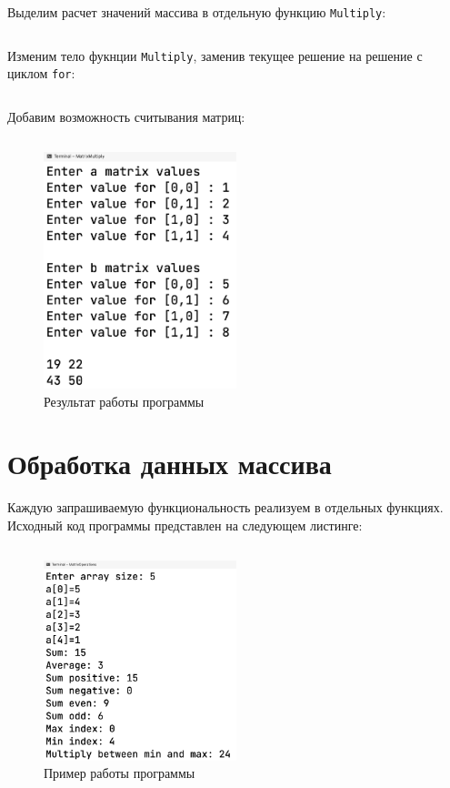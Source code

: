 \documentclass[a4paper,14pt]{extarticle}
\numberwithin{figure}{section}
\begin{document}
Выделим расчет значений массива в отдельную функцию \texttt{Multiply}:
\inputminted{csharp}{../MatrixMultiply/MatrixMultiply/MatrixMultiply2.cs}

Изменим тело фукнции \texttt{Multiply}, заменив текущее решение на решение с циклом \texttt{for}:
\inputminted{csharp}{../MatrixMultiply/MatrixMultiply/MatrixMultiply3.cs}

Добавим возможность считывания матриц:
\inputminted{csharp}{../MatrixMultiply/MatrixMultiply/MatrixMultiply4.cs}

\begin{figure}[H]
    \centering
    \includegraphics[width=0.5\textwidth]{images/task-2-3.png}
    \caption{Результат работы программы}
\end{figure}

\section{Обработка данных массива}

Каждую запрашиваемую функциональность реализуем в отдельных функциях. Исходный код программы представлен на следующем листинге:

\inputminted{csharp}{../MatrixOperations/MatrixOperations/Program.cs}

\begin{figure}[H]
    \centering
    \includegraphics[width=0.5\textwidth]{images/task-3.png}
    \caption{Пример работы программы}
\end{figure}
\end{document}
